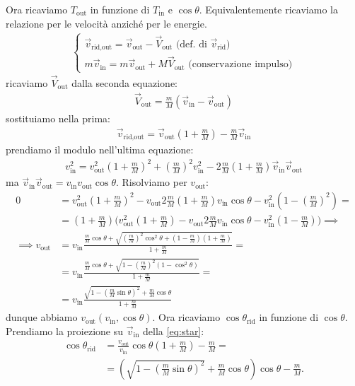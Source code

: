 Ora ricaviamo $T_\text{out}$ in funzione di $T_\text{in}$ e $\cos\theta$.
Equivalentemente ricaviamo la relazione per le velocità anziché per le energie.
\begin{align*}
	\begin{cases}
		\vec v_\text{rid,out} = \vec v_\text{out} - \vec V_\text{out} \text{ (def. di $\vec v_\text{rid}$)}\\
		m \vec v_\text{in} = m \vec v_\text{out} + M \vec V_\text{out} \text{ (conservazione impulso)}
	\end{cases}
\end{align*}
ricaviamo $\vec V_\text{out}$ dalla seconda equazione:
\begin{align*}
	\vec V_\text{out} = \frac mM (\vec v_\text{in} - \vec v_\text{out})
\end{align*}
sostituiamo nella prima:
\begin{align}
	\label{eq:star}
	\vec v_\text{rid,out}
	= \vec v_\text{out} \left(1 + \frac mM\right) - \frac mM \vec v_\text{in}
\end{align}
prendiamo il modulo nell'ultima equazione:
\begin{align*}
	v_\text{in}^2
	= v_\text{out}^2 \left(1 + \frac mM\right)^2 + \left(\frac mM\right)^2 v_\text{in}^2
	- 2 \frac mM \left(1 + \frac mM\right) \vec v_\text{in} \vec v_\text{out}
\end{align*}
ma $\vec v_\text{in}\vec v_\text{out} = v_\text{in} v_\text{out} \cos\theta$.
Risolviamo per $v_\text{out}$:
\begin{align*}
	0
	&= v_\text{out}^2 \left(1 + \frac mM\right)^2
	- v_\text{out} 2\frac mM\left(1 + \frac mM\right) v_\text{in} \cos\theta
	- v_\text{in}^2 \left(1 - \left(\frac mM\right)^2 \right) = \\
	&= \left(1 + \frac mM\right) \Bigg(
   v_\text{out}^2 \left(1 + \frac mM\right)
  	- v_\text{out} 2\frac mM v_\text{in} \cos\theta
  	- v_\text{in}^2 \left(1 - \frac mM\right)
	\Bigg) \implies \\
	\implies v_\text{out}
	&= v_\text{in} \frac
	{\frac mM \cos\theta + \sqrt{\left(\frac mM\right)^2 \cos^2\theta + \left(1-\frac mM\right)\left(1+\frac mM\right)}}
	{1 + \frac mM} = \\
	&= v_\text{in} \frac
	{\frac mM \cos\theta + \sqrt{1 - \left(\frac mM\right)^2 (1-\cos^2\theta)}}
	{1 + \frac mM} = \\
	&= v_\text{in} \frac
	{\sqrt{1 - \left(\frac mM\sin\theta\right)^2} + \frac mM\cos\theta}
	{1 + \frac mM}
\end{align*}
dunque abbiamo $v_\text{out}(v_\text{in},\cos\theta)$.
Ora ricaviamo $\cos\theta_\text{rid}$ in funzione di $\cos\theta$.
Prendiamo la proiezione su $\vec v_\text{in}$ della \eqref{eq:star}:
\begin{align*}
	\cos\theta_\text{rid}
	&= \frac{v_\text{out}}{v_\text{in}} \cos\theta \left(1+\frac mM\right) - \frac mM = \\
	&= \left( \sqrt{1 - \left(\frac mM \sin\theta\right)^2} + \frac mM \cos\theta \right) \cos\theta - \frac mM.
\end{align*}
